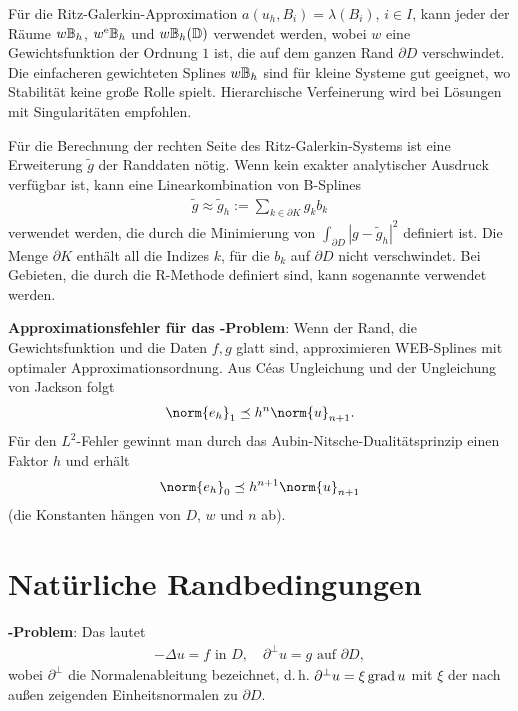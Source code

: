 \linie

Für die Ritz-Galerkin-Approximation $a(u_h, B_i) = \lambda(B_i)$, $i \in I$,
kann jeder der Räume $w\mathbb{B}_h$, $w^{\mathrm{e}}\mathbb{B}_h$ und $w\mathbb{B}_h(\mathbb{D})$ verwendet werden, wobei
$w$ eine Gewichtsfunktion der Ordnung $1$ ist, die auf dem ganzen Rand $\partial D$ verschwindet.
Die einfacheren gewichteten Splines $w\mathbb{B}_h$ sind für kleine Systeme gut geeignet,
wo Stabilität keine große Rolle spielt.
Hierarchische Verfeinerung wird bei Lösungen mit Singularitäten empfohlen.

Für die Berechnung der rechten Seite des Ritz-Galerkin-Systems ist eine Erweiterung $\widetilde{g}$
der Randdaten nötig.
Wenn kein exakter analytischer Ausdruck verfügbar ist, kann eine Linearkombination von B-Splines
\begin{align*}
    \widetilde{g} \approx \widetilde{g}_h := \sum_{k \in \partial K} g_k b_k
\end{align*}
verwendet werden, die durch die Minimierung von $\int_{\partial D} |g - \widetilde{g}_h|^2$
definiert ist.
Die Menge $\partial K$ enthält all die Indizes $k$, für die $b_k$ auf $\partial D$ nicht
verschwindet.
Bei Gebieten, die durch die R-Methode definiert sind, kann sogenannte
 verwendet werden.

\linie
\pagebreak

\textbf{Approximationsfehler für das -Problem}:
Wenn der Rand, die Gewichtsfunktion und die Daten $f, g$ glatt sind,
approximieren WEB-Splines mit optimaler Approximationsordnung.
Aus Céas Ungleichung und der Ungleichung von Jackson folgt
\begin{align*}
    \norm{e_h}_1 \preceq h^n \norm{u}_{n+1}.
\end{align*}
Für den $L^2$-Fehler gewinnt man durch das Aubin-Nitsche-Dualitätsprinzip einen Faktor $h$
und erhält
\begin{align*}
    \norm{e_h}_0 \preceq h^{n+1} \norm{u}_{n+1}
\end{align*}
(die Konstanten hängen von $D$, $w$ und $n$ ab).

\section{%
    Natürliche Randbedingungen%
}

\textbf{-Problem}:
Das  lautet
\begin{align*}
    -\Delta u = f \text{ in } D,\quad
    \partial^\perp u = g \text{ auf } \partial D,
\end{align*}
wobei $\partial^\perp$ die Normalenableitung bezeichnet, d.\,h. $\partial^\perp u = \xi \operatorname{grad} u$
mit $\xi$ der nach außen zeigenden Einheitsnormalen zu $\partial D$.

